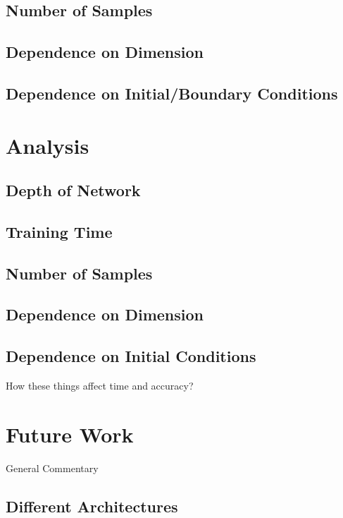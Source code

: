 \documentclass{article}
\begin{document}
\subsection{Number of Samples}

\subsection{Dependence on Dimension}

\subsection{Dependence on Initial/Boundary Conditions}


\section{Analysis}

\subsection{Depth of Network}

\subsection{Training Time}

\subsection{Number of Samples}

\subsection{Dependence on Dimension}

\subsection{Dependence on Initial Conditions}

How these things affect time and accuracy?

\section{Future Work}

General Commentary

\subsection{Different Architectures}
\end{document}
